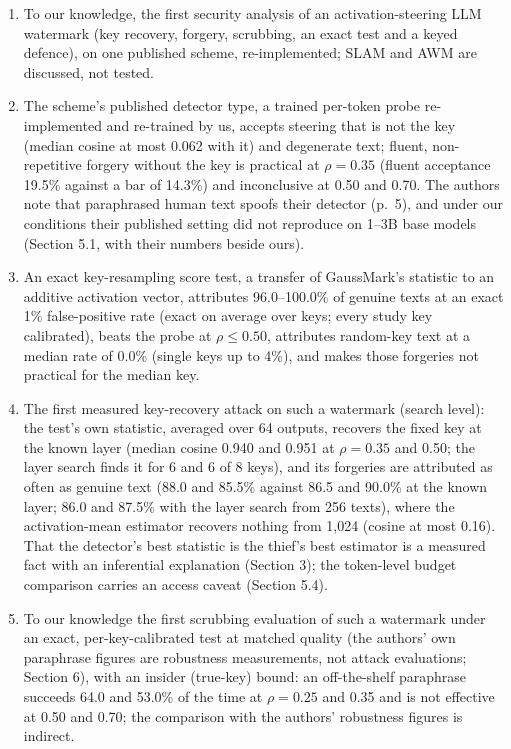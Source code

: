 \documentclass[11pt,letterpaper]{article}
\providecommand{\tightlist}{\setlength{\itemsep}{0pt}\setlength{\parskip}{0pt}}
\begin{document}
\begin{enumerate}
\def\labelenumi{\arabic{enumi}.}
\tightlist
\item
  To our knowledge, the first security analysis of an activation-steering LLM watermark (key recovery, forgery, scrubbing, an exact test and a keyed defence), on one published scheme, re-implemented; SLAM and AWM are discussed, not tested.
\item
  The scheme's published detector type, a trained per-token probe re-implemented and re-trained by us, accepts steering that is not the key (median cosine at most 0.062 with it) and degenerate text; fluent, non-repetitive forgery without the key is practical at \(\rho = 0.35\) (fluent acceptance 19.5\% against a bar of 14.3\%) and inconclusive at 0.50 and 0.70. The authors note that paraphrased human text spoofs their detector (p.~5), and under our conditions their published setting did not reproduce on 1--3B base models (Section 5.1, with their numbers beside ours).
\item
  An exact key-resampling score test, a transfer of GaussMark's statistic \citep{block2025gaussmark} to an additive activation vector, attributes 96.0--100.0\% of genuine texts at an exact 1\% false-positive rate (exact on average over keys; every study key calibrated), beats the probe at \(\rho \leq 0.50\), attributes random-key text at a median rate of 0.0\% (single keys up to 4\%), and makes those forgeries not practical for the median key.
\item
  The first measured key-recovery attack on such a watermark (search level): the test's own statistic, averaged over 64 outputs, recovers the fixed key at the known layer (median cosine 0.940 and 0.951 at \(\rho = 0.35\) and 0.50; the layer search finds it for 6 and 6 of 8 keys), and its forgeries are attributed as often as genuine text (88.0 and 85.5\% against 86.5 and 90.0\% at the known layer; 86.0 and 87.5\% with the layer search from 256 texts), where the activation-mean estimator recovers nothing from 1,024 (cosine at most 0.16). That the detector's best statistic is the thief's best estimator is a measured fact with an inferential explanation (Section 3); the token-level budget comparison carries an access caveat (Section 5.4).
\item
  To our knowledge the first scrubbing evaluation of such a watermark under an exact, per-key-calibrated test at matched quality (the authors' own paraphrase figures are robustness measurements, not attack evaluations; Section 6), with an insider (true-key) bound: an off-the-shelf paraphrase succeeds 64.0 and 53.0\% of the time at \(\rho = 0.25\) and 0.35 and is not effective at 0.50 and 0.70; the comparison with the authors' robustness figures is indirect.

\end{enumerate}
\end{document}
